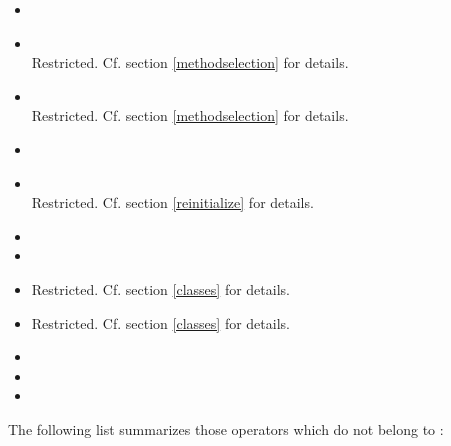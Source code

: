 \begin{itemize}
\item {}

\item {} \\
Restricted. Cf. section \ref{methodselection} for details.

\item {} \\
Restricted. Cf. section \ref{methodselection} for details.

\item {}

\item {} \\ 
Restricted. Cf. section \ref{reinitialize} for details.

\item {} 

\item {}  

\item {} 
Restricted. Cf. section \ref{classes} for details.

\item {}
Restricted. Cf. section \ref{classes} for details.

\item {} 

\item {}

\item {}

\end{itemize}

The following list summarizes those operators which do not belong to 
:

